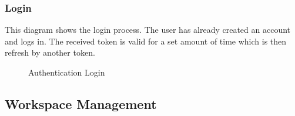 \subsubsection{Login}
This diagram shows the login process. The user has already created an account and logs in. The received token is valid for a set amount of time which is then refresh by another token.
\begin{figure}[!htb]
    \centering
    \caption{Authentication Login}
    \label{fig:seq-auth-login}
\end{figure}

\subsection{Workspace Management}

